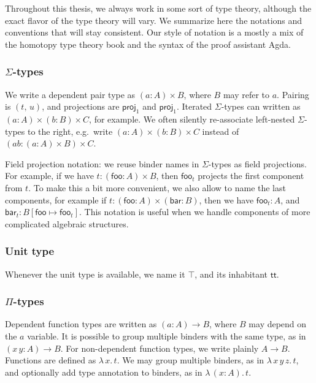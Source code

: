 \documentclass[12pt,a4paper,twoside,openany]{book}
\theoremstyle{remark}
\theoremstyle{definition}
\theoremstyle{theorem}
\newcommand{\mi}[1]{\mathit{#1}}
\newcommand{\ms}[1]{\mathsf{#1}}
\newcommand{\proj}{\mathsf{proj}}
\renewcommand{\tt}{\mathsf{tt}}
\begin{document}
Throughout this thesis, we always work in some sort of type theory, although the
exact flavor of the type theory will vary. We summarize here the notations and
conventions that will stay consistent. Our style of notation is a mostly a mix of
the homotopy type theory book \cite{hottbook} and the syntax of the proof
assistant Agda.

\subsubsection{$\Sigma$-types}

We write a dependent pair type as $(a : A) \times B$, where $B$ may refer to
$a$.  Pairing is $(t,\,u)$, and projections are $\proj_1$ and
$\proj_1$. Iterated $\Sigma$-types can written as $(a : A) \times (b : B) \times
C$, for example. We often silently re-associate left-nested $\Sigma$-types to
the right, e.g.\ write $(a : A) \times (b : B) \times C$ instead of
$(\mi{ab} : (a : A) \times B) \times C$.

Field projection notation: we reuse binder names in $\Sigma$-types as field
projections. For example, if we have $t : (\ms{foo} : A) \times B$, then
$\ms{foo}_t$ projects the first component from $t$. To make this a bit more
convenient, we also allow to name the last components, for example if $t :
(\ms{foo} : A) \times (\ms{bar} : B)$, then we have $\ms{foo}_t : A$, and
$\ms{bar}_t : B[\ms{foo} \mapsto \ms{foo}_t]$. This notation is useful when we
handle components of more complicated algebraic structures.

\subsubsection{Unit type}

Whenever the unit type is available, we name it $\top$, and its inhabitant $\tt$.

\subsubsection{$\Pi$-types}
Dependent function types are written as $(a : A) \to B$, where $B$ may depend on
the $a$ variable. It is possible to group multiple binders with the same type,
as in $(x\,y : A) \to B$. For non-dependent function types, we write plainly $A
\to B$.  Functions are defined as $\lambda\,x.\,t$. We may group multiple
binders, as in $\lambda\,x\,y\,z.\,t$, and optionally add type annotation to binders,
as in $\lambda\,(x : A).\,t$.
\end{document}
